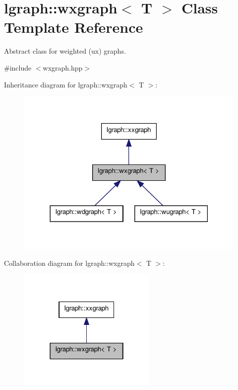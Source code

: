 \hypertarget{classlgraph_1_1wxgraph}{\section{lgraph\-:\-:wxgraph$<$ T $>$ Class Template Reference}
\label{classlgraph_1_1wxgraph}
}


Abstract class for weighted (ux) graphs.  




{\ttfamily \#include $<$wxgraph.\-hpp$>$}



Inheritance diagram for lgraph\-:\-:wxgraph$<$ T $>$\-:
\nopagebreak
\begin{figure}[H]
\begin{center}
\leavevmode
\includegraphics[width=318pt]{classlgraph_1_1wxgraph__inherit__graph}
\end{center}
\end{figure}


Collaboration diagram for lgraph\-:\-:wxgraph$<$ T $>$\-:
\nopagebreak
\begin{figure}[H]
\begin{center}
\leavevmode
\includegraphics[width=190pt]{classlgraph_1_1wxgraph__coll__graph}
\end{center}
\end{figure}
